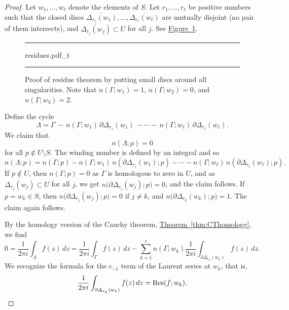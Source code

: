 \documentclass[12pt,openany]{book}
\theoremstyle{plain}
\theoremstyle{remark}
\theoremstyle{definition}
\newenvironment{myfig}{%
\begin{figure}[h!t]
\noindent\rule{\textwidth}{0.5pt}\vspace{12pt}\par\centering}%
{\par\noindent\rule{\textwidth}{0.5pt}
\end{figure}}
\theoremstyle{exercise}
\theoremstyle{example}
\newcommand{\figureref}[1]{\hyperref[#1]{Figure~\ref*{#1}}}
\newcommand{\thmref}[1]{\hyperref[#1]{Theorem~\ref*{#1}}}
\begin{document}
\begin{proof}
Let $w_1,\ldots,w_\ell$ denote the elements of $S$.
Let $r_1,\ldots,r_\ell$ be positive numbers such that
the closed discs
$\overline{\Delta_{r_1}(w_1)},\ldots, \overline{\Delta_{r_\ell}(w_\ell)}$
are mutually disjoint (no pair of them intersects), and
$\overline{\Delta_{r_j}(w_j)} \subset U$ for all $j$.
See \figureref{fig:residues}.

\begin{myfig}
{residues.pdf_t}
\caption{Proof of residue theorem by putting small discs around all
singularities.  Note that $n(\Gamma;w_1) = 1$, $n(\Gamma;w_2)=0$, and
$n(\Gamma;w_3) = 2$.\label{fig:residues}}
\end{myfig}

Define the cycle
\begin{equation*}
\Lambda = \Gamma \,
- \, n(\Gamma;w_1) \, \partial \Delta_{r_1} (w_1)
\, -
\cdots
- \, n(\Gamma;w_\ell) \, \partial \Delta_{r_\ell} (w_\ell) .
\end{equation*}
We claim that
\begin{equation*}
n(\Lambda;p) = 0
\end{equation*}
for all $p \notin U \setminus S$.
The winding number is defined by an integral and so
\begin{equation*}
n(\Lambda;p) = n(\Gamma;p)
- n(\Gamma;w_1) \, n(\partial \Delta_{r_1} (w_1) ; p)
-
\cdots
- n(\Gamma;w_\ell) \, n(\partial \Delta_{r_\ell} (w_\ell) ; p) .
\end{equation*}
If $p \notin U$, then $n(\Gamma;p) = 0$ as $\Gamma$ is homologous to zero in
$U$,
and as 
$\overline{\Delta_{r_j}(w_j)} \subset U$ for all $j$, we get
$n\bigl( \partial \Delta_{r_j}(w_j) ; p\bigr) = 0$, and the claim follows.
If $p = w_k \in S$, then 
$n\bigl( \partial \Delta_{r_j}(w_j) ; p\bigr) = 0$ if $j \not= k$,
and
$n\bigl( \partial \Delta_{r_k}(w_k) ; p\bigr) = 1$.
The claim again follows.

By the homology version of the Cauchy theorem, \thmref{thm:CThomology}, we find
\begin{equation*}
0 = 
\frac{1}{2 \pi i}
\int_\Lambda f(z) \, dz
=
\frac{1}{2 \pi i}
\int_\Gamma f(z) \, dz
-
\sum_{k=1}^\ell
n(\Gamma;w_k)
\frac{1}{2 \pi i}
\int_{\partial \Delta_{r_k}(w_k)} f(z) \, dz .
\end{equation*}
We recognize the formula for the $c_{-1}$ term of the Laurent series at
$w_k$, that is,
\begin{equation*}
\frac{1}{2 \pi i}
\int_{\partial \Delta_{r_k}(w_k)} f(z) \, dz
= \operatorname{Res}(f;w_k) .  \qedhere
\end{equation*}
\end{proof}
\end{document}

